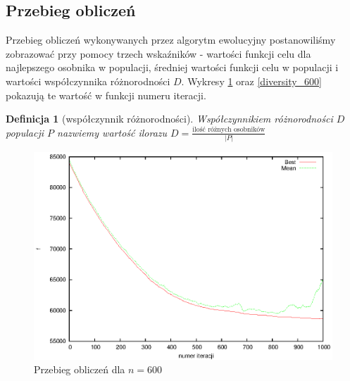 \documentclass[11pt, a4wide]{mwart}
\newtheorem{definition}{Definicja}
\begin{document}
\subsection{Przebieg obliczeń}
Przebieg obliczeń wykonywanych przez algorytm ewolucyjny postanowiliśmy zobrazować
przy pomocy trzech wskaźników - wartości funkcji celu dla najlepszego osobnika
w populacji, średniej wartości funkcji celu w populacji i wartości współczynnika 
różnorodności $D$. Wykresy \ref{wykres_600} oraz \ref{diversity_600} pokazują te
wartość w funkcji numeru iteracji.


\begin{definition}[współczynnik różnorodności] 
Współczynnikiem różnorodności $D$ populacji $P$ nazwiemy wartość ilorazu
$D = \frac{\text{ilość różnych osobników}}{|P|}$
\end{definition}



\begin{figure}[H]
\caption{Przebieg obliczeń dla $n = 600$ }
\label{wykres_600}
\begin{center}
  \includegraphics{wykres_600.eps}
\end{center}
\end{figure}
\end{document}
